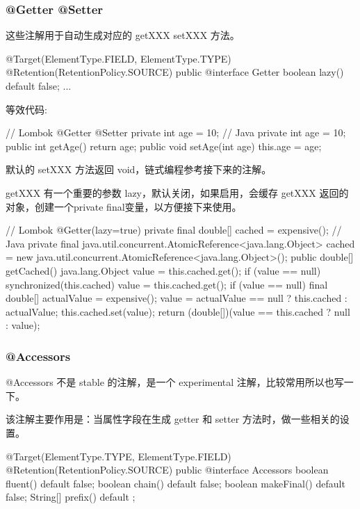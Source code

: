 \subsubsection{@Getter @Setter}

这些注解用于自动生成对应的 getXXX setXXX 方法。

\begin{Java}
@Target({ElementType.FIELD, ElementType.TYPE})
@Retention(RetentionPolicy.SOURCE)
public @interface Getter {
    boolean lazy() default false;
    ...
}
\end{Java}

等效代码:

\begin{Java}
// Lombok
@Getter @Setter private int age = 10;
// Java
private int age = 10;
public int getAge() {
    return age;
}
public void setAge(int age) {
    this.age = age;
}
\end{Java}

默认的 setXXX 方法返回 void，链式编程参考接下来的注解。

getXXX 有一个重要的参数 lazy，默认关闭，如果启用，会缓存 getXXX 返回的对象，创建一个private final变量，以方便接下来使用。

\begin{Java}
// Lombok
@Getter(lazy=true) private final double[] cached = expensive();
// Java
private final java.util.concurrent.AtomicReference<java.lang.Object> cached = new java.util.concurrent.AtomicReference<java.lang.Object>();
public double[] getCached() {
    java.lang.Object value = this.cached.get();
    if (value == null) {
        synchronized(this.cached) {
            value = this.cached.get();
            if (value == null) {
                final double[] actualValue = expensive();
                value = actualValue == null ? this.cached : actualValue;
                this.cached.set(value);
            }
        }
    }
    return (double[])(value == this.cached ? null : value);
}
\end{Java}

\subsubsection{@Accessors}
@Accessors 不是 stable 的注解，是一个 experimental 注解，比较常用所以也写一下。

该注解主要作用是：当属性字段在生成 getter 和 setter 方法时，做一些相关的设置。

\begin{Java}
@Target({ElementType.TYPE, ElementType.FIELD})
@Retention(RetentionPolicy.SOURCE)
public @interface Accessors {
	boolean fluent() default false;
	boolean chain() default false;
	boolean makeFinal() default false;
	String[] prefix() default {};
}
\end{Java}

